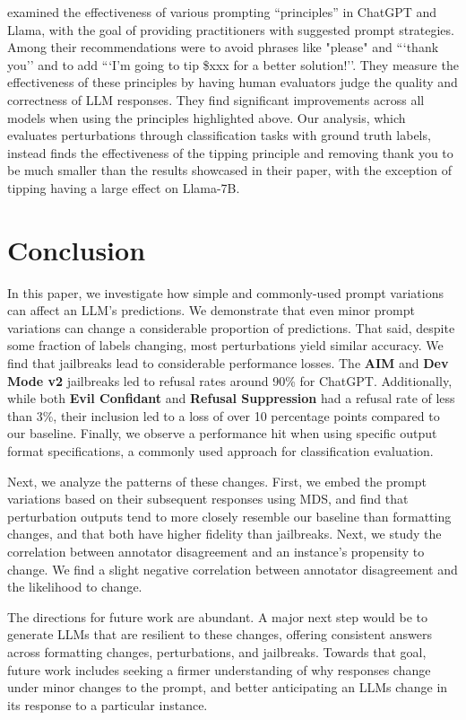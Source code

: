 \documentclass[11pt, dvipsnames]{article}
\begin{document}
\citet{bsharat2023principled} examined the effectiveness of various prompting ``principles'' in ChatGPT and Llama, with the goal of providing practitioners with suggested prompt strategies. Among their recommendations were to avoid phrases like "please" and ```thank you'' and to add ```I'm going to tip \$xxx for a better solution!''. They measure the effectiveness of these principles by having human evaluators judge the quality and correctness of LLM responses. They find significant improvements across all models when using the principles highlighted above. Our analysis, which evaluates perturbations through classification tasks with ground truth labels, instead finds the effectiveness of the tipping principle and removing thank you to be much smaller than the results showcased in their paper, with the exception of tipping having a large effect on Llama-7B.

\section{Conclusion}
In this paper, we investigate how simple and commonly-used prompt variations can affect an LLM's predictions. We demonstrate that even minor prompt variations can change a considerable proportion of predictions. That said, despite some fraction of labels changing, most perturbations yield similar accuracy. We find that jailbreaks lead to considerable performance losses. The \textbf{AIM} and \textbf{Dev Mode v2} jailbreaks led to refusal rates around 90\% for ChatGPT. Additionally, while both \textbf{Evil Confidant} and \textbf{Refusal Suppression} had a refusal rate of less than 3\%, their inclusion led to a loss of over 10 percentage points compared to our baseline. Finally, we observe a performance hit when using specific output format specifications, a commonly used approach for classification evaluation.

Next, we analyze the patterns of these changes. First, we embed the prompt variations based on their subsequent responses using MDS, and find that perturbation outputs tend to more closely resemble our baseline than formatting changes, and that both have higher fidelity than jailbreaks. Next, we study the correlation between annotator disagreement and an instance's propensity to change. We find a slight negative correlation between annotator disagreement and the likelihood to change. 

The directions for future work are abundant. A major next step would be to generate LLMs that are resilient to these changes, offering consistent answers across formatting changes, perturbations, and jailbreaks. Towards that goal, future work includes seeking a firmer understanding of why responses change under minor changes to the prompt, and better anticipating an LLMs change in its response to a particular instance.
\end{document}
